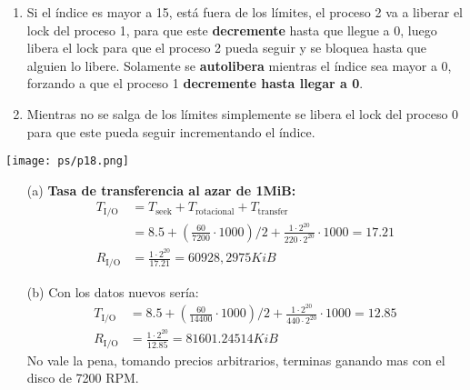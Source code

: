 \documentclass[openany]{book}
\begin{document}
\begin{rta}
\begin{itemize}
\begin{enumerate}
            \item Si el índice es mayor a 15, está fuera de los límites, el proceso 2 va a liberar el lock del proceso 1, para que este \textbf{decremente} hasta que llegue a 0, luego libera el lock para que el proceso 2 pueda seguir y se bloquea hasta que alguien lo libere. Solamente se \textbf{autolibera} mientras el índice sea mayor a 0, forzando a que el proceso 1 \textbf{decremente hasta llegar a 0}.
            \item Mientras no se salga de los límites simplemente se libera el lock del proceso 0 para que este pueda seguir incrementando el índice.
        \end{enumerate}
    \end{itemize}
\end{rta}
\newpage
\texttt{[image: ps/p18.png]}

\begin{rta}
    \begin{itemize}
        \item[(a)] \textbf{Tasa de transferencia al azar de 1MiB:}
        \begin{align*}
            T_{\text{I/O}} &= T_{\text{seek}} + T_{\text{rotacional}} + T_{\text{transfer}} \\
                           &= 8.5 + \left( \frac{60}{7200} \cdot 1000  \right)/2 + \frac{1 \cdot 2^{20}}{220 \cdot 2^{20}} \cdot 1000 = 17.21 \\
            R_{\text{I/O}} &= \frac{1 \cdot 2^{20}}{17.21} = 60928,2975 KiB                   
        \end{align*}
        \item [(b)] Con los datos nuevos sería:
        \begin{align*}
            T_{\text{I/O}} &= 8.5 + \left( \frac{60}{14400} \cdot 1000  \right)/2 + \frac{1 \cdot 2^{20}}{440 \cdot 2^{20}} \cdot 1000 = 12.85 \\
            R_{\text{I/O}} &= \frac{1 \cdot 2^{20}}{12.85} = 81601.24514 KiB
        \end{align*}
        No vale la pena, tomando precios arbitrarios, terminas ganando mas con el disco de 7200 RPM.
    \end{itemize}
\end{rta}
\end{document}
